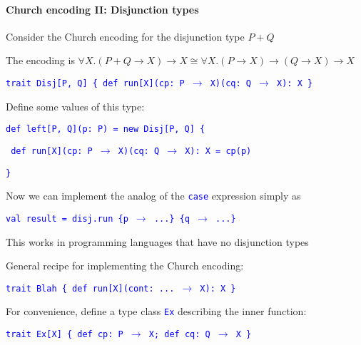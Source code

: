 \paragraph{Church encoding II: Disjunction types}

Consider the Church encoding for the disjunction type $P+Q$ 

The encoding is {\footnotesize{}$\forall X.\left(P+Q\rightarrow X\right)\rightarrow X\cong\forall X.\left(P\rightarrow X\right)\rightarrow\left(Q\rightarrow X\right)\rightarrow X$}{\footnotesize\par}

\texttt{\textcolor{blue}{\footnotesize{}trait Disj{[}P, Q{]} \{ def
run{[}X{]}(cp: P $\rightarrow$ X)(cq: Q $\rightarrow$ X): X \}}}{\footnotesize\par}

Define some values of this type:

\texttt{\textcolor{blue}{\footnotesize{}def left{[}P, Q{]}(p: P) =
new Disj{[}P, Q{]} \{}}{\footnotesize\par}

\texttt{\textcolor{blue}{\footnotesize{} def run{[}X{]}(cp: P $\rightarrow$
X)(cq: Q $\rightarrow$ X): X = cp(p) }}{\footnotesize\par}

\texttt{\textcolor{blue}{\footnotesize{}\}}}{\footnotesize\par}

Now we can implement the analog of the \texttt{\textcolor{blue}{\footnotesize{}case}}
expression simply as

\texttt{\textcolor{blue}{\footnotesize{}val result = disj.run \{p
$\rightarrow$ ...\} \{q $\rightarrow$ ...\}}}{\footnotesize\par}

This works in programming languages that have no disjunction types

General recipe for implementing the Church encoding: 

\texttt{\textcolor{blue}{\footnotesize{}trait Blah \{ def run{[}X{]}(cont: ... $\rightarrow$
X): X \}}}{\footnotesize\par}

For convenience, define a type class \texttt{\textcolor{blue}{\footnotesize{}Ex}}
describing the inner function:

\texttt{\textcolor{blue}{\footnotesize{}trait Ex{[}X{]} \{ def cp: P
$\rightarrow$ X; def cq: Q $\rightarrow$ X \}}}{\footnotesize\par}

